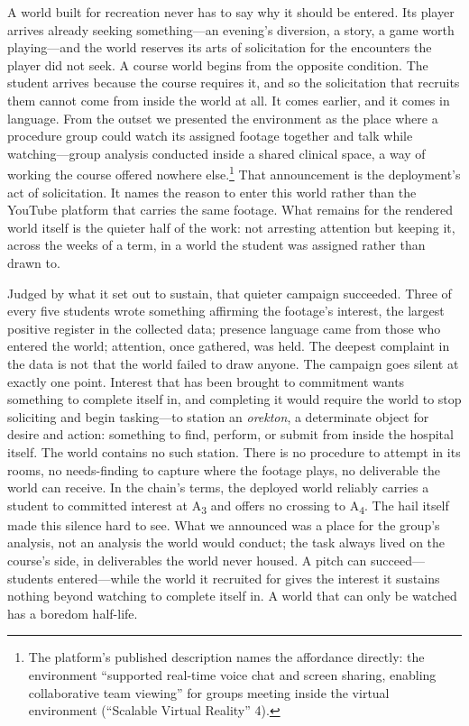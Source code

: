 A world built for recreation never has to say why it should be entered.
Its player arrives already seeking something---an evening's diversion, a
story, a game worth playing---and the world reserves its arts of
solicitation for the encounters the player did not seek. A course world
begins from the opposite condition. The student arrives because the
course requires it, and so the solicitation that recruits them cannot
come from inside the world at all. It comes earlier, and it comes in
language. From the outset we presented the environment as the place
where a procedure group could watch its assigned footage together and
talk while watching---group analysis conducted inside a shared clinical
space, a way of working the course offered nowhere else.\footnote{The
platform's published description names the affordance directly: the
environment ``supported real-time voice chat and screen sharing,
enabling collaborative team viewing'' for groups meeting inside the
virtual environment (``Scalable Virtual Reality'' 4).} That
announcement is the deployment's act of solicitation. It names the
reason to enter this world rather than the YouTube platform that
carries the same footage. What remains for the rendered world itself is
the quieter half of the work: not arresting attention but keeping it,
across the weeks of a term, in a world the student was assigned rather
than drawn to.

Judged by what it set out to sustain, that quieter campaign succeeded.
Three of every five students wrote something affirming the footage's
interest, the largest positive register in the collected data;
presence language came from those who entered the world; attention,
once gathered, was held. The deepest complaint in the data is not that
the world failed to draw anyone. The campaign goes silent at exactly one
point. Interest that has been brought to commitment wants something to
complete itself in, and completing it would require the world to stop
soliciting and begin tasking---to station an \textit{orekton}, a
determinate object for desire and action: something to find, perform,
or submit from inside the hospital itself. The world contains no such
station. There is no procedure to attempt in its rooms, no
needs-finding to capture where the footage plays, no deliverable the
world can receive. In the chain's terms, the deployed world reliably
carries a student to committed interest at A\textsubscript{3} and
offers no crossing to A\textsubscript{4}. The hail itself made this
silence hard to see. What we announced was a place for the group's
analysis, not an analysis the world would conduct; the task always
lived on the course's side, in deliverables the world never housed. A
pitch can succeed---students entered---while the world it recruited for
gives the interest it sustains nothing beyond watching to complete itself
in. A world that can only be watched has a boredom half-life.

